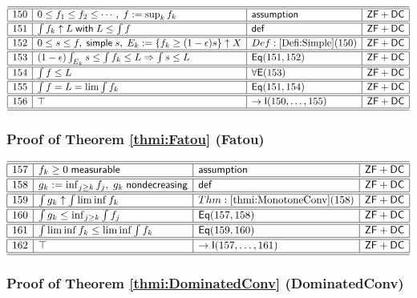 \documentclass[11pt,reqno]{amsart}
\begin{document}
\noindent$%
\begin{array}{|r|l|l|l|}
\hline\hline
150 & 0\le f_{1}\le f_{2}\le\cdots,\;f:=\sup_{k}f_{k} & \mathsf{assumption} & \mathsf{ZF+DC} \\ \hline\hline
151 & \int f_{k}\uparrow L\;\mathsf{with}\;L\le\int f & \mathsf{def} & \mathsf{ZF+DC} \\ \hline\hline
152 & 0\le s\le f,\;\mathsf{simple}\;s,\;E_{k}:=\{f_{k}\ge(1-\epsilon)s\}\uparrow X & Def:\ref{Defi:Simple}(150) & \mathsf{ZF+DC} \\ \hline\hline
153 & (1-\epsilon)\int_{E_{k}}s\le\int f_{k}\le L\Rightarrow\int s\le L & \mathsf{Eq}(151,152) & \mathsf{ZF+DC} \\ \hline\hline
154 & \int f\le L & \forall\mathsf{E}(153) & \mathsf{ZF+DC} \\ \hline\hline
155 & \int f=L=\lim\int f_{k} & \mathsf{Eq}(151,154) & \mathsf{ZF+DC} \\ \hline\hline
156 & \top & \to\mathsf{I}(150,\dots,155) & \mathsf{ZF+DC} \\ \hline\hline
\end{array}%
$

\medskip

\subsubsection*{Proof of Theorem \ref{thmi:Fatou} (\textsf{Fatou})}

\noindent$%
\begin{array}{|r|l|l|l|}
\hline\hline
157 & f_{k}\ge0\;\mathsf{measurable} & \mathsf{assumption} & \mathsf{ZF+DC} \\ \hline\hline
158 & g_{k}:=\inf_{j\ge k}f_{j},\;g_{k}\;\mathsf{nondecreasing} & \mathsf{def} & \mathsf{ZF+DC} \\ \hline\hline
159 & \int g_{k}\uparrow\int\liminf f_{k} & Thm:\ref{thmi:MonotoneConv}(158) & \mathsf{ZF+DC} \\ \hline\hline
160 & \int g_{k}\le\inf_{j\ge k}\int f_{j} & \mathsf{Eq}(157,158) & \mathsf{ZF+DC} \\ \hline\hline
161 & \int\liminf f_{k}\le\liminf\int f_{k} & \mathsf{Eq}(159,160) & \mathsf{ZF+DC} \\ \hline\hline
162 & \top & \to\mathsf{I}(157,\dots,161) & \mathsf{ZF+DC} \\ \hline\hline
\end{array}%
$

\medskip

\subsubsection*{Proof of Theorem \ref{thmi:DominatedConv} (\textsf{DominatedConv})}
\end{document}
